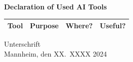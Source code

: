 \documentclass[a4paper,oneside,bibliography=totoc]{scrbook}
\begin{document}
\begin{center}
  \textbf{Declaration of Used AI Tools} \\[.3em]
  \begin{tabularx}{\textwidth}{lXlc}
    \toprule
    Tool & Purpose & Where? & Useful? \\
    \midrule
    \bottomrule
  \end{tabularx}
\end{center}

\vspace{2cm}
\noindent Unterschrift\\
\noindent Mannheim, den XX.~XXXX 2024 \hfill
\end{document}

